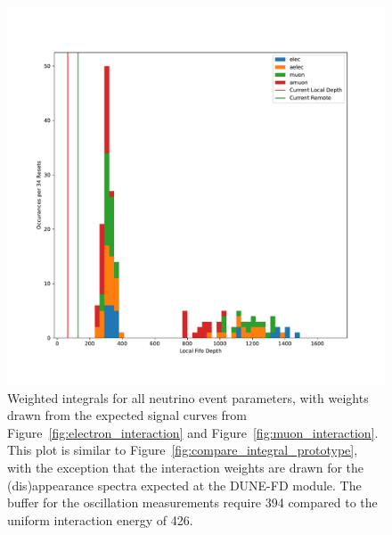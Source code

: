 \begin{figure}[]
\centering
\includegraphics[width=\textwidth]{images/df_weight_pdg_cut.pdf}
\caption{Weighted integrals for all neutrino event parameters, with weights drawn from the expected signal curves from Figure~\ref{fig:electron_interaction} and Figure~\ref{fig:muon_interaction}.
This plot is similar to Figure~\ref{fig:compare_integral_prototype}, with the exception that the interaction weights are drawn for the (dis)appearance spectra expected at the DUNE-FD module.
The buffer for the oscillation measurements require 394 compared to the uniform interaction energy of 426. 
}
\end{figure}~\label{fig:weighted_integrals}